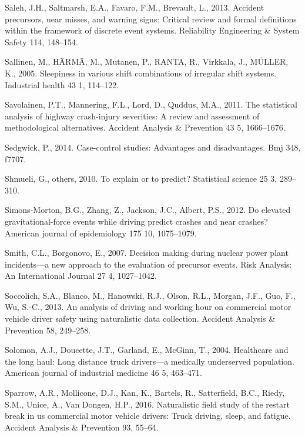 \documentclass[12pt]{book}
\numberwithin{equation}{chapter}
\begin{document}
\leavevmode\hypertarget{ref-saleh2013accident}{}%
Saleh, J.H., Saltmarsh, E.A., Favaro, F.M., Brevault, L., 2013. Accident precursors, near misses, and warning signs: Critical review and formal definitions within the framework of discrete event systems. Reliability Engineering \& System Safety 114, 148--154.

\leavevmode\hypertarget{ref-sallinen2005sleepiness}{}%
Sallinen, M., HÄRMÄ, M., Mutanen, P., RANTA, R., Virkkala, J., MÜLLER, K., 2005. Sleepiness in various shift combinations of irregular shift systems. Industrial health 43 1, 114--122.

\leavevmode\hypertarget{ref-savolainen2011statistical}{}%
Savolainen, P.T., Mannering, F.L., Lord, D., Quddus, M.A., 2011. The statistical analysis of highway crash-injury severities: A review and assessment of methodological alternatives. Accident Analysis \& Prevention 43 5, 1666--1676.

\leavevmode\hypertarget{ref-sedgwick2014case}{}%
Sedgwick, P., 2014. Case-control studies: Advantages and disadvantages. Bmj 348, f7707.

\leavevmode\hypertarget{ref-shmueli2010explain}{}%
Shmueli, G., others, 2010. To explain or to predict? Statistical science 25 3, 289--310.

\leavevmode\hypertarget{ref-simons2012elevated}{}%
Simons-Morton, B.G., Zhang, Z., Jackson, J.C., Albert, P.S., 2012. Do elevated gravitational-force events while driving predict crashes and near crashes? American journal of epidemiology 175 10, 1075--1079.

\leavevmode\hypertarget{ref-smith2007decision}{}%
Smith, C.L., Borgonovo, E., 2007. Decision making during nuclear power plant incidents---a new approach to the evaluation of precursor events. Risk Analysis: An International Journal 27 4, 1027--1042.

\leavevmode\hypertarget{ref-soccolich2013analysis}{}%
Soccolich, S.A., Blanco, M., Hanowski, R.J., Olson, R.L., Morgan, J.F., Guo, F., Wu, S.-C., 2013. An analysis of driving and working hour on commercial motor vehicle driver safety using naturalistic data collection. Accident Analysis \& Prevention 58, 249--258.

\leavevmode\hypertarget{ref-solomon2004healthcare}{}%
Solomon, A.J., Doucette, J.T., Garland, E., McGinn, T., 2004. Healthcare and the long haul: Long distance truck drivers---a medically underserved population. American journal of industrial medicine 46 5, 463--471.

\leavevmode\hypertarget{ref-sparrow2016naturalistic}{}%
Sparrow, A.R., Mollicone, D.J., Kan, K., Bartels, R., Satterfield, B.C., Riedy, S.M., Unice, A., Van Dongen, H.P., 2016. Naturalistic field study of the restart break in us commercial motor vehicle drivers: Truck driving, sleep, and fatigue. Accident Analysis \& Prevention 93, 55--64.
\end{document}

